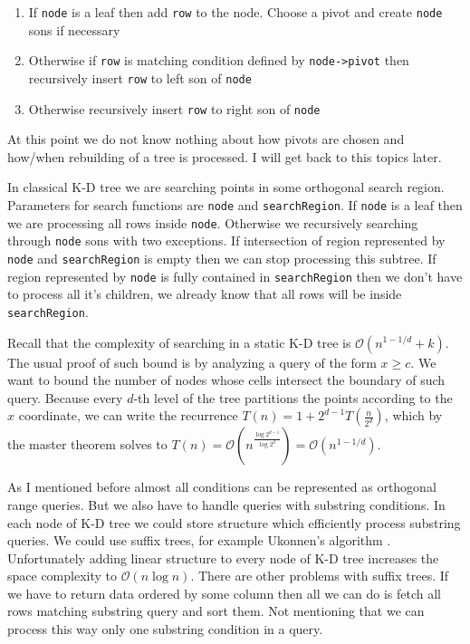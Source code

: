 \documentclass[10pt,a4paper]{article}
\newcommand{\Oh}{\mathcal{O}}
\begin{document}
\begin{enumerate}
\item If \verb|node| is a leaf then add \verb|row| to the node. Choose a pivot and create \verb|node| sons if necessary
\item Otherwise if \verb|row| is matching condition defined by \verb|node->pivot| then recursively insert \verb|row| to left son of \verb|node|
\item Otherwise recursively insert \verb|row| to right son of \verb|node|
\end{enumerate}

At this point we do not know nothing about how pivots are chosen and how/when rebuilding of a tree is processed. I will get back to this topics later.

In classical K-D tree we are searching points in some orthogonal search region. Parameters for search functions are \verb|node| and \verb|searchRegion|. If \verb|node| is a leaf then we are processing all rows inside \verb|node|. Otherwise we recursively searching through \verb|node| sons with two exceptions. If intersection of region represented by \verb|node| and \verb|searchRegion| is empty then we can stop processing this subtree. If region represented by \verb|node| is fully contained in \verb|searchRegion| then we don't have to process all it's children, we already know that all rows will be inside \verb|searchRegion|.

Recall that the complexity of searching in a static K-D tree is $\Oh(n^{1-1/d} + k)$. The usual proof of such bound is by analyzing a query of the form $x \geq c$. We want to bound the number of nodes whose cells intersect the boundary of such query. Because every $d$-th level of the tree partitions the points according to the $x$ coordinate, we can write the recurrence $T(n)=1+2^{d-1}T(\frac{n}{2^{d}})$, which by the master theorem solves to $T(n)=\Oh(n^{\frac{\log 2^{d-1}}{\log 2^{d}}})=\Oh(n^{1-1/d})$. 

As I mentioned before almost all conditions can be represented as orthogonal range queries. But we also have to handle queries with substring conditions. In each node of K-D tree we could store structure which efficiently process substring queries. We could use suffix trees, for example Ukonnen's algorithm \cite{STUKK}. Unfortunately adding linear structure to every node of K-D tree increases the space complexity to $\Oh(n \log n)$. There are other problems with suffix trees. If we have to return data ordered by some column then all we can do is fetch all rows matching substring query and sort them. Not mentioning that we can process this way only one substring condition in a query.
\end{document}
